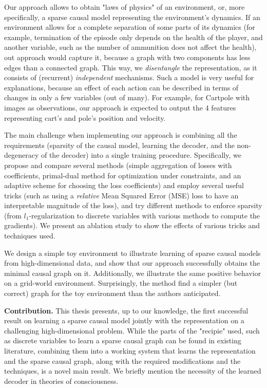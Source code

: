\documentclass[a4paper,11pt,oneside]{report}
\begin{document}
Our approach allows to obtain "laws of physics" of an environment, or, more specifically, a sparse causal model representing the environment's dynamics.
If an environment allows for a complete separation of some parts of its dynamics (for example, termination of the episode only depends on the health of the player, and another variable, such as the number of ammunition does not affect the health), out approach would capture it, because a graph with two components has less edges than a connected graph. This way, we {\em disentangle} the representation, as it consists of (recurrent) {\em independent} mechanisms.
Such a model is very useful for explanations, because an effect of each action can be described in terms of changes in only a few variables (out of many). For example, for Cartpole with images as observations, our approach is expected to output the 4 features representing cart's and pole's position and velocity.

The main challenge when implementing our approach is combining all the requirements (sparsity of the causal model, learning the decoder, and the non-degeneracy of the decoder) into a single training procedure. Specifically, we propose and compare several methods (simple aggregation of losses with coefficients, primal-dual method for optimization under constraints, and an adaptive scheme for choosing the loss coefficients) and employ several useful tricks (such as using a {\em relative} Mean Squared Error (MSE) loss to have an interpretable magnitude of the loss), and try different methods to enforce sparsity (from $l_1$-regularization to discrete variables with various methods to compute the gradients). We present an ablation study to show the effects of various tricks and techniques used.

We design a simple toy environment to illustrate learning of sparse causal models from high-dimensional data, and show that our approach successfully obtains the minimal causal graph on it. Additionally, we illustrate the same positive behavior on a grid-world environment. Surprisingly, the method find a simpler (but correct) graph for the toy environment than the authors anticipated.

{\bf Contribution.} This thesis presents, up to our knowledge, the first successful result on learning a sparse causal model jointly with the representation on a challenging high-dimensional problem. While the parts of the "recipie" used, such as discrete variables to learn a sparse causal graph can be found in existing literature, combining them into a working system that learns the representation and the sparse causal graph, along with the required modifications and the techniques, is a novel main result. We briefly mention the necessity of the learned decoder in theories of consciousness.
\end{document}
